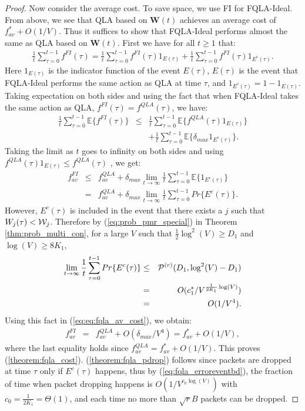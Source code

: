 \documentclass[journal]{IEEEtran}
\newcommand{\prob}{Pr}
\newcommand{\expect}[1]{\mathbb{E}\big\{#1\big\}}
\newcommand{\bv}[1]{{\boldsymbol{#1} }}
\newcommand{\script}[1]{{{\cal{#1} }}}
\begin{document}
\begin{proof}
Now consider the average cost. To save space, we use FI for FQLA-Ideal. From above, we see that QLA based on $\bv{W}(t)$ achieves an average cost of $f^*_{av}+O(1/V)$. Thus it suffices to show that FQLA-Ideal performs almost the same as QLA based on $\bv{W}(t)$. First we have for all $t\geq1$ that:
\begin{eqnarray*}
\frac{1}{t}\sum_{\tau=0}^{t-1}f^{FI}(\tau)=\frac{1}{t}\sum_{\tau=0}^{t-1}f^{FI}(\tau)1_{E(\tau)}+\frac{1}{t}\sum_{\tau=0}^{t-1}f^{FI}(\tau)1_{E^c(\tau)}.
\end{eqnarray*}
Here $1_{E(\tau)}$ is the indicator function of the event $E(\tau)$, $E(\tau)$ is the event that FQLA-Ideal performs the same action as QLA at time $\tau$, and $1_{E^c(\tau)}=1-1_{E(\tau)}$. Taking expectation on both sides and using the fact that when FQLA-Ideal takes the same action as QLA, $f^{FI}(\tau)=f^{QLA}(\tau)$, we have:
\begin{eqnarray*}
\frac{1}{t}\sum_{\tau=0}^{t-1}\expect{f^{FI}(\tau)}&\leq&\frac{1}{t}\sum_{\tau=0}^{t-1}\expect{f^{QLA}(\tau)1_{E(\tau)}}\\
&&+\frac{1}{t}\sum_{\tau=0}^{t-1}\expect{\delta_{max}1_{E^c(\tau)}}.
\end{eqnarray*}
Taking the limit as $t$ goes to infinity on both sides and using $f^{QLA}(\tau)1_{E(\tau)}\leq f^{QLA}(\tau)$ , we get: 
\begin{eqnarray}
f^{FI}_{av}&\leq& f^{QLA}_{av} +\delta_{max}\lim_{t\rightarrow\infty}\frac{1}{t}\sum_{\tau=0}^{t-1}\expect{1_{E^c(\tau)}}\nonumber\\
&=& f^{QLA}_{av} +\delta_{max}\lim_{t\rightarrow\infty}\frac{1}{t}\sum_{\tau=0}^{t-1}\prob\{ E^c(\tau)\}.\label{eq:eq:fqla_av_cost}
\end{eqnarray}
However, $E^c(\tau)$ is included in the event that there exists a $j$ such that $W_j(\tau)<\script{W}_j$. Therefore by (\ref{eq:prob_pmr_special}) in Theorem \ref{thm:prob_multi_con}, for a large $V$ such that $\frac{1}{2}\log^2(V)\geq D_1$ and $\log(V)\geq8K_1$,
\begin{eqnarray}
\lim_{t\rightarrow\infty}\frac{1}{t}\sum_{\tau=0}^{t-1}\prob\{ E^c(\tau)\}&\leq& \script{P}^{(r)}(D_1, \log^2(V)-D_1) \nonumber\\
&=&O(c^*_1/V^{\frac{1}{2K_1}\log(V)})\nonumber\\
&=&O(1/V^4). \label{eq:fqla_erroreventbd}
\end{eqnarray}
Using this fact in (\ref{eq:eq:fqla_av_cost}), we obtain:
\begin{eqnarray*}
f^{FI}_{av}&=& f^{QLA}_{av} +O(\delta_{max}/V^4)= f^*_{av}+O(1/V), 
\end{eqnarray*}
where the last equality holds since $f^{QLA}_{av}=f^*_{av}+O(1/V)$. This proves (\ref{theorem:fqla_cost}). (\ref{theorem:fqla_pdrop}) follows since packets are dropped at time $\tau$ only if $E^c(\tau)$ happens, thus by (\ref{eq:fqla_erroreventbd}), the fraction of time when packet dropping happens is $O(1/V^{c_0\log(V)})$ with $c_0=\frac{1}{2K_1}=\Theta(1)$, and each time no more than $\sqrt{r}B$ packets can be dropped. 
\end{proof}
\end{document}
